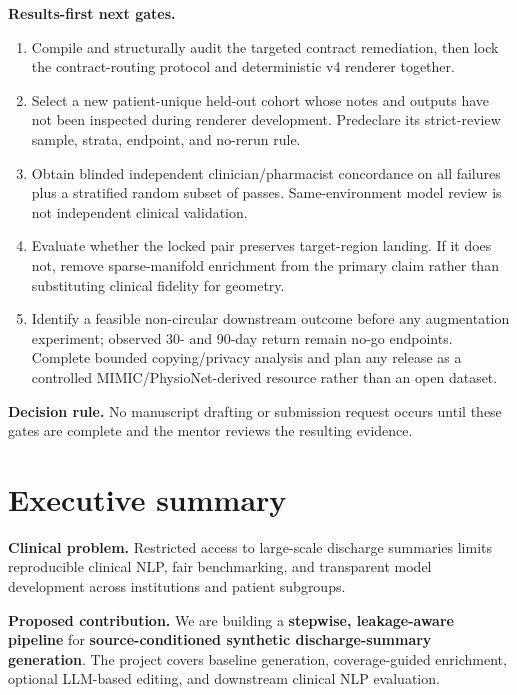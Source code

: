 \documentclass[11pt]{article}
\begin{document}
\textbf{Results-first next gates.}
\begin{enumerate}[nosep]
  \item Compile and structurally audit the targeted contract remediation, then
  lock the contract-routing protocol and deterministic v4 renderer together.
  \item Select a new patient-unique held-out cohort whose notes and outputs have
  not been inspected during renderer development. Predeclare its strict-review
  sample, strata, endpoint, and no-rerun rule.
  \item Obtain blinded independent clinician/pharmacist concordance on all
  failures plus a stratified random subset of passes. Same-environment model
  review is not independent clinical validation.
  \item Evaluate whether the locked pair preserves target-region landing. If it
  does not, remove sparse-manifold enrichment from the primary claim rather
  than substituting clinical fidelity for geometry.
  \item Identify a feasible non-circular downstream outcome before any
  augmentation experiment; observed 30- and 90-day return remain no-go
  endpoints. Complete bounded copying/privacy analysis and plan any release as
  a controlled MIMIC/PhysioNet-derived resource rather than an open dataset.
\end{enumerate}

\textbf{Decision rule.} No manuscript drafting or submission request occurs
until these gates are complete and the mentor reviews the resulting evidence.

\section*{Executive summary}

\textbf{Clinical problem.}
Restricted access to large-scale discharge summaries limits reproducible clinical NLP, fair benchmarking, and transparent model development across institutions and patient subgroups.

\textbf{Proposed contribution.}
We are building a \textbf{stepwise, leakage-aware pipeline} for \textbf{source-conditioned synthetic discharge-summary generation}. The project covers baseline generation, coverage-guided enrichment, optional LLM-based editing, and downstream clinical NLP evaluation.
\end{document}
